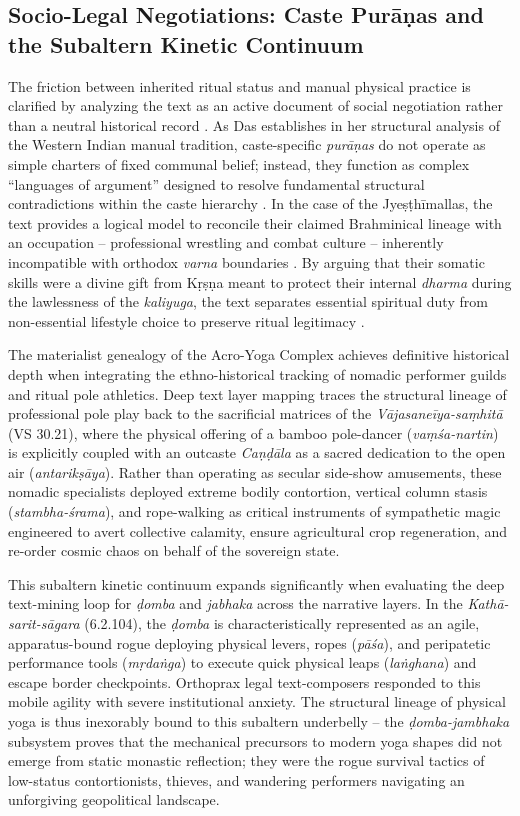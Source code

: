 \documentclass[11pt,twoside,letterpaper]{article}
\begin{document}
\subsection{Socio-Legal Negotiations: Caste Purāṇas and the Subaltern Kinetic Continuum}
The friction between inherited ritual status and manual physical practice is clarified by analyzing the text as an active document of social negotiation rather than a neutral historical record \citep{Das1968}. As Das establishes in her structural analysis of the Western Indian manual tradition, caste-specific \textit{purāṇas} do not operate as simple charters of fixed communal belief; instead, they function as complex ``languages of argument'' designed to resolve fundamental structural contradictions within the caste hierarchy \citep{Das1968}. In the case of the Jyeṣṭhīmallas, the text provides a logical model to reconcile their claimed Brahminical lineage with an occupation -- professional wrestling and combat culture -- inherently incompatible with orthodox \textit{varna} boundaries \citep{Das1968}. By arguing that their somatic skills were a divine gift from Kṛṣṇa meant to protect their internal \textit{dharma} during the lawlessness of the \textit{kaliyuga}, the text separates essential spiritual duty from non-essential lifestyle choice to preserve ritual legitimacy \citep{Das1968}.

The materialist genealogy of the Acro-Yoga Complex achieves definitive historical depth when integrating the ethno-historical tracking of nomadic performer guilds and ritual pole athletics. Deep text layer mapping traces the structural lineage of professional pole play back to the sacrificial matrices of the \textit{Vājasaneīya-saṃhitā} (VS 30.21), where the physical offering of a bamboo pole-dancer (\textit{vaṃśa-nartin}) is explicitly coupled with an outcaste \textit{Caṇḍāla} as a sacred dedication to the open air (\textit{antarikṣāya}). Rather than operating as secular side-show amusements, these nomadic specialists deployed extreme bodily contortion, vertical column stasis (\textit{stambha-śrama}), and rope-walking as critical instruments of sympathetic magic engineered to avert collective calamity, ensure agricultural crop regeneration, and re-order cosmic chaos on behalf of the sovereign state.

This subaltern kinetic continuum expands significantly when evaluating the deep text-mining loop for \textit{ḍomba} and \textit{jabhaka} across the narrative layers. In the \textit{Kathā-sarit-sāgara} (6.2.104), the \textit{ḍomba} is characteristically represented as an agile, apparatus-bound rogue deploying physical levers, ropes (\textit{pāśa}), and peripatetic performance tools (\textit{mṛdaṅga}) to execute quick physical leaps (\textit{laṅghana}) and escape border checkpoints. Orthoprax legal text-composers responded to this mobile agility with severe institutional anxiety. The structural lineage of physical yoga is thus inexorably bound to this subaltern underbelly -- the \textit{ḍomba-jambhaka} subsystem proves that the mechanical precursors to modern yoga shapes did not emerge from static monastic reflection; they were the rogue survival tactics of low-status contortionists, thieves, and wandering performers navigating an unforgiving geopolitical landscape.
\end{document}
